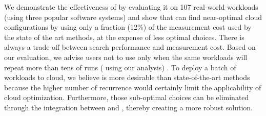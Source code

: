 We demonstrate the effectiveness of \micky by evaluating it on 107 real-world workloads (using three popular software systems) and show that \micky can find near-optimal cloud configurations by using only a fraction (12\%) of the measurement cost used by the state of the art methods, at the expense of less optimal choices.
There is always a trade-off between search performance and measurement cost.
Based on our evaluation,
we advise users not to use \micky
only when the same workloads will repeat  more than tens of runs ( using our analysis) .
To deploy a batch of workloads to cloud,
we believe \micky is more desirable than state-of-the-art methods
because the higher number of recurrence would certainly
limit the applicability of cloud optimization.
Furthermore, those sub-optimal choices can be eliminated
through the integration between \micky and \scout,
thereby creating a more robust solution.
